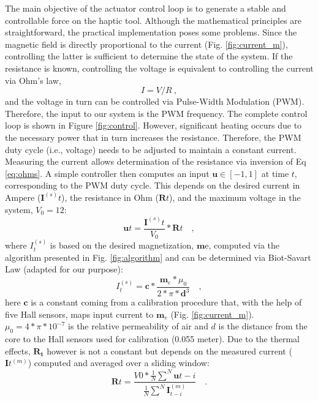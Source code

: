 The main objective of the actuator control loop is to generate a stable and controllable force on the haptic tool. Although the mathematical principles are straightforward, the practical implementation poses some problems. Since the magnetic field is directly proportional to the current (Fig. \ref{fig:current_m}), controlling the latter is sufficient to determine the state of the system. If the resistance is known, controlling the voltage is equivalent to controlling the current via Ohm's law,
\begin{equation}\label{eq:ohms}
I = V/R \ ,
\end{equation}
\noindent and the voltage in turn can be controlled via Pulse-Width Modulation (PWM). Therefore, the input to our system is the PWM frequency. The complete control loop is shown in Figure \ref{fig:control}.
However, significant heating occurs due to the necessary power that in turn increases the resistance. Therefore, the PWM duty cycle (i.e., voltage) needs to be adjusted to maintain a constant current. Measuring the current allows determination of the resistance via inversion of Eq \ref{eq:ohms}. A simple controller then computes an input $\mathbf{u} \in [-1,1]$ at time $t$, corresponding to the PWM duty cycle. This depends on the desired current in Ampere ($\mathbf{I}^{(s)}t$), the resistance in Ohm ($\mathbf{R}t$), and the maximum voltage in the system, $V_0=12$:
\begin{equation}\label{eq:control-law}
\mathbf{u}{t} = \frac{\mathbf{I}^{(s)}{t}}{V_0}*\mathbf{R}t \quad ,
\end{equation}
\noindent where $I_t^{(s)}$ is based on the desired magnetization, $\mathbf{m}\text{e}$, computed via the algorithm presented in Fig. \ref{fig:algorithm} and can be determined via Biot-Savart Law (adapted for our purpose):
\begin{equation}\label{eq:I_vs_me}
I_t^{(s)} = \mathbf{c} * \frac{\mathbf{m}_e * \mu_0}{2*\pi*\mathbf{d}^3} \quad ,
\end{equation}
\noindent here $\mathbf{c}$ is a constant coming from a calibration procedure that, with the help of five Hall sensors, maps input current to $\mathbf{m}_e$ (Fig. \ref{fig:current_m}). $\mu_0=4*\pi*10^{-7}$ is the relative permeability of air and $d$ is the distance from the core to the Hall sensors used for calibration (0.055 meter).
Due to the thermal effects, $\mathbf{R_t}$ however is not a constant but depends on the measured current ($\mathbf{I}t^{(m)}$) computed and averaged over a sliding window:
\begin{equation}
\mathbf{R}t = \frac{V{0} * \frac{1}{N}\sum^N \mathbf{u}{t-i}}{\frac{1}{N}\sum^N\mathbf{I}^{(m)}_{t-i} } \quad .
\end{equation}